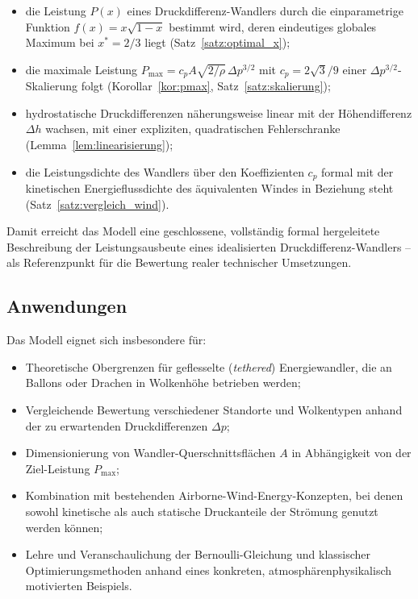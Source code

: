 ﻿\documentclass[a4paper,12pt]{article}
\theoremstyle{definition}
\begin{document}
\begin{itemize}
	\item die Leistung $P(x)$ eines Druckdifferenz-Wandlers durch die
	einparametrige Funktion $f(x) = x\sqrt{1-x}$ bestimmt wird, deren
	eindeutiges globales Maximum bei $x^\ast = 2/3$ liegt
	(Satz~\ref{satz:optimal_x});
	\item die maximale Leistung $P_{\max} = c_p A\sqrt{2/\rho}\,
	\Delta p^{3/2}$ mit $c_p = 2\sqrt{3}/9$ einer
	$\Delta p^{3/2}$-Skalierung folgt (Korollar~\ref{kor:pmax},
	Satz~\ref{satz:skalierung});
	\item hydrostatische Druckdifferenzen näherungsweise linear mit der
	Höhendifferenz $\Delta h$ wachsen, mit einer expliziten,
	quadratischen Fehlerschranke (Lemma~\ref{lem:linearisierung});
	\item die Leistungsdichte des Wandlers über den Koeffizienten $c_p$
	formal mit der kinetischen Energieflussdichte des äquivalenten
	Windes in Beziehung steht (Satz~\ref{satz:vergleich_wind}).
\end{itemize}

Damit erreicht das Modell eine geschlossene, vollständig formal
hergeleitete Beschreibung der Leistungsausbeute eines idealisierten
Druckdifferenz-Wandlers -- als Referenzpunkt für die Bewertung realer
technischer Umsetzungen.

\subsection{Anwendungen}

Das Modell eignet sich insbesondere für:

\begin{itemize}
	\item Theoretische Obergrenzen für geflesselte
	(\emph{tethered}) Energiewandler, die an Ballons oder Drachen in
	Wolkenhöhe betrieben werden;
	\item Vergleichende Bewertung verschiedener Standorte und
	Wolkentypen anhand der zu erwartenden Druckdifferenzen $\Delta p$;
	\item Dimensionierung von Wandler-Querschnittsflächen $A$ in
	Abhängigkeit von der Ziel-Leistung $P_{\max}$;
	\item Kombination mit bestehenden Airborne-Wind-Energy-Konzepten,
	bei denen sowohl kinetische als auch statische Druckanteile der
	Strömung genutzt werden können;
	\item Lehre und Veranschaulichung der Bernoulli-Gleichung und
	klassischer Optimierungsmethoden anhand eines konkreten,
	atmosphärenphysikalisch motivierten Beispiels.
\end{itemize}
\end{document}
